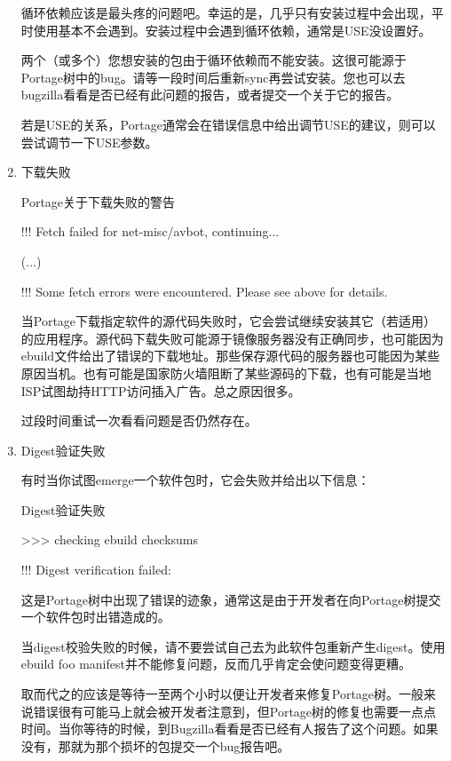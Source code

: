 \begin{enumerate}
循环依赖应该是最头疼的问题吧。幸运的是，几乎只有安装过程中会出现，平时使用基本不会遇到。安装过程中会遇到循环依赖，通常是USE没设置好。

两个（或多个）您想安装的包由于循环依赖而不能安装。这很可能源于Portage树中的bug。请等一段时间后重新sync再尝试安装。您也可以去bugzilla看看是否已经有此问题的报告，或者提交一个关于它的报告。

若是USE的关系，Portage通常会在错误信息中给出调节USE的建议，则可以尝试调节一下USE参数。

\item 下载失败

\begin{example}{Portage关于下载失败的警告}
\begin{code}
!!! Fetch failed for net-misc/avbot, continuing...

(...)

!!! Some fetch errors were encountered.  Please see above for details.
\end{code}
\end{example}

当Portage下载指定软件的源代码失败时，它会尝试继续安装其它（若适用）的应用程序。源代码下载失败可能源于镜像服务器没有正确同步，也可能因为ebuild文件给出了错误的下载地址。那些保存源代码的服务器也可能因为某些原因当机。也有可能是国家防火墙阻断了某些源码的下载，也有可能是当地ISP试图劫持HTTP访问插入广告。总之原因很多。

过段时间重试一次看看问题是否仍然存在。

\item Digest验证失败

有时当你试图emerge一个软件包时，它会失败并给出以下信息：

\begin{example}{Digest验证失败}
\begin{code}
>>> checking ebuild checksums

!!! Digest verification failed:
\end{code}
\end{example}

这是Portage树中出现了错误的迹象，通常这是由于开发者在向Portage树提交一个软件包时出错造成的。

当digest校验失败的时候，请不要尝试自己去为此软件包重新产生digest。使用ebuild foo manifest并不能修复问题，反而几乎肯定会使问题变得更糟。

取而代之的应该是等待一至两个小时以便让开发者来修复Portage树。一般来说错误很有可能马上就会被开发者注意到，但Portage树的修复也需要一点点时间。当你等待的时候，到Bugzilla看看是否已经有人报告了这个问题。如果没有，那就为那个损坏的包提交一个bug报告吧。


\end{enumerate}
